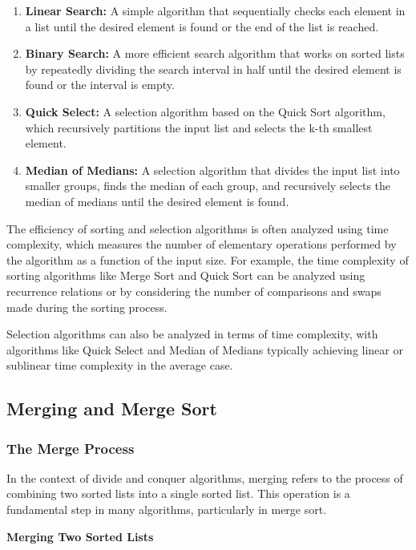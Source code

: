 \documentclass[12pt]{book} %
\begin{document}
\begin{enumerate}
    \item \textbf{Linear Search:} A simple algorithm that sequentially checks each element in a list until the desired element is found or the end of the list is reached.
    
    \item \textbf{Binary Search:} A more efficient search algorithm that works on sorted lists by repeatedly dividing the search interval in half until the desired element is found or the interval is empty.
    
    \item \textbf{Quick Select:} A selection algorithm based on the Quick Sort algorithm, which recursively partitions the input list and selects the k-th smallest element.
    
    \item \textbf{Median of Medians:} A selection algorithm that divides the input list into smaller groups, finds the median of each group, and recursively selects the median of medians until the desired element is found.
\end{enumerate}

The efficiency of sorting and selection algorithms is often analyzed using time complexity, which measures the number of elementary operations performed by the algorithm as a function of the input size. For example, the time complexity of sorting algorithms like Merge Sort and Quick Sort can be analyzed using recurrence relations or by considering the number of comparisons and swaps made during the sorting process.

Selection algorithms can also be analyzed in terms of time complexity, with algorithms like Quick Select and Median of Medians typically achieving linear or sublinear time complexity in the average case.

\subsection{Merging and Merge Sort}
\subsubsection{The Merge Process}
In the context of divide and conquer algorithms, merging refers to the process of combining two sorted lists into a single sorted list. This operation is a fundamental step in many algorithms, particularly in merge sort.

\textbf{Merging Two Sorted Lists}
\end{document}

